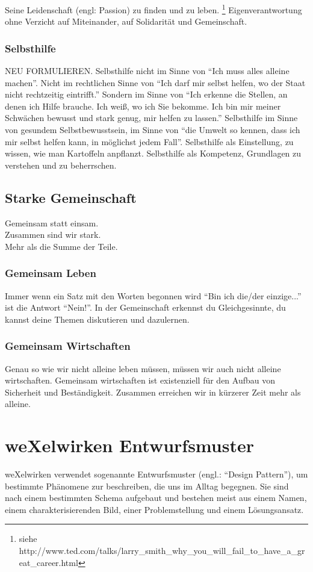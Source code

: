 %
Seine Leidenschaft (engl: Passion) zu finden und zu leben. \footnote{siehe http://www.ted.com/talks/larry\_smith\_why\_you\_will\_fail\_to\_have\_a\_great\_career.html} 
%
Eigenverantwortung ohne Verzicht auf Miteinander, auf Solidarität und Gemeinschaft.
%

      \subsubsection{Selbsthilfe}
NEU FORMULIEREN. Selbsthilfe nicht im Sinne von "`Ich muss alles alleine machen"'.
%
Nicht im rechtlichen Sinne von "`Ich darf mir selbst helfen, wo der Staat nicht rechtzeitig eintrifft."'
%
Sondern im Sinne von "`Ich erkenne die Stellen, an denen ich Hilfe brauche.
%
Ich weiß, wo ich Sie bekomme.
%
Ich bin mir meiner Schwächen bewusst und stark genug, mir helfen zu lassen."'
%
Selbsthilfe im Sinne von gesundem Selbstbewusstsein, im Sinne von "`die Umwelt so kennen, dass ich mir selbst helfen kann, in möglichst jedem Fall"'.
%
Selbsthilfe als Einstellung, zu wissen, wie man Kartoffeln anpflanzt.
%
Selbsthilfe als Kompetenz, Grundlagen zu verstehen und zu beherrschen.
    \subsection{Starke Gemeinschaft}
Gemeinsam statt einsam.\\
Zusammen sind wir stark.\\
Mehr als die Summe der Teile.\\
      \subsubsection{Gemeinsam Leben}
Immer wenn ein Satz mit den Worten begonnen wird "`Bin ich die/der einzige..."' ist die Antwort "`Nein!"'.
%
In der Gemeinschaft erkennst du Gleichgesinnte, du kannst deine Themen diskutieren und dazulernen.
      \subsubsection{Gemeinsam Wirtschaften}
Genau so wie wir nicht alleine leben müssen, müssen wir auch nicht alleine wirtschaften.
%
Gemeinsam wirtschaften ist existenziell für den Aufbau von Sicherheit und Beständigkeit.
%
Zusammen erreichen wir in kürzerer Zeit mehr als alleine.
  \section{weXelwirken Entwurfsmuster}
weXelwirken  verwendet  sogenannte  Entwurfsmuster (engl.:  "`Design  Pattern"'),  um  bestimmte Phänomene zur beschreiben, die uns im Alltag begegnen.
%
Sie sind nach einem bestimmten Schema aufgebaut  und  bestehen  meist  aus  einem  Namen,  einem  charakterisierenden  Bild,  einer Problemstellung und einem Lösungsansatz.



